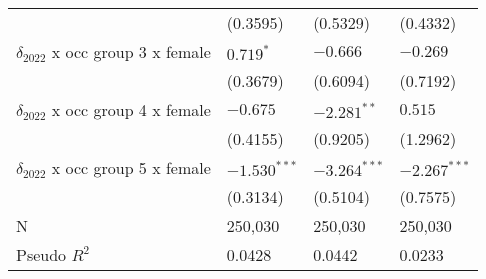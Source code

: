 \begin{tabular}{llll}
                                       &           (0.3595) &           (0.5329) &           (0.4332) \\
$\delta_{2022}$ x occ group 3 x female &          $0.719^*$ &           $-0.666$ &           $-0.269$ \\
                                       &           (0.3679) &           (0.6094) &           (0.7192) \\
$\delta_{2022}$ x occ group 4 x female &           $-0.675$ &      $-2.281^{**}$ &            $0.515$ \\
                                       &           (0.4155) &           (0.9205) &           (1.2962) \\
$\delta_{2022}$ x occ group 5 x female &     $-1.530^{***}$ &     $-3.264^{***}$ &     $-2.267^{***}$ \\
                                       &           (0.3134) &           (0.5104) &           (0.7575) \\
\midrule
N                                      &            250,030 &            250,030 &            250,030 \\
Pseudo $R^2$                           &             0.0428 &             0.0442 &             0.0233 \\
\bottomrule
\end{tabular}
